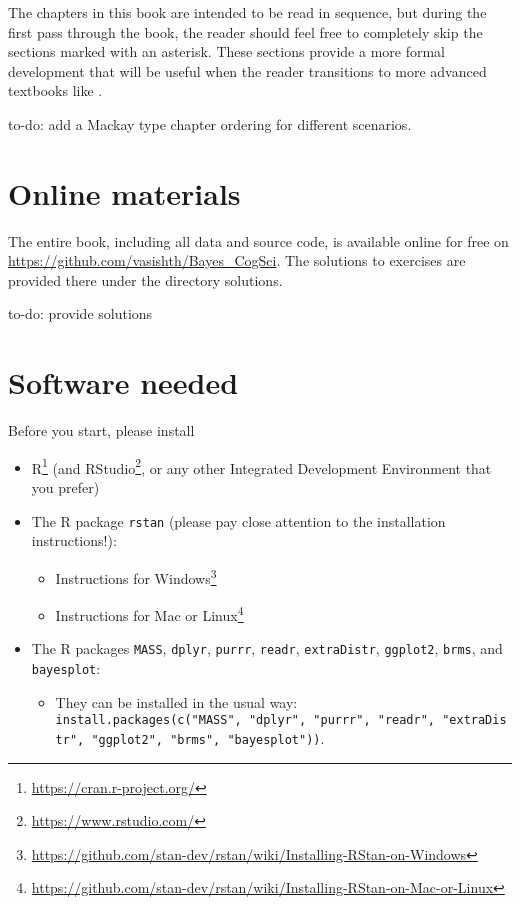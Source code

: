 \documentclass[12pt,]{krantz}
\providecommand{\tightlist}{%
  \setlength{\itemsep}{0pt}\setlength{\parskip}{0pt}}
\renewcommand{\href}[2]{#2\footnote{\url{#1}}}
\let\BeginKnitrBlock\begin \let\EndKnitrBlock\end
\begin{document}
The chapters in this book are intended to be read in sequence, but during the first pass through the book, the reader should feel free to completely skip the sections marked with an asterisk. These sections provide a more formal development that will be useful when the reader transitions to more advanced textbooks like \citet{Gelman14}.

\BeginKnitrBlock{rmdnote}
to-do: add a Mackay type chapter ordering for different scenarios.
\EndKnitrBlock{rmdnote}

\hypertarget{online-materials}{%
\section{Online materials}\label{online-materials}}

The entire book, including all data and source code, is available online for free on \url{https://github.com/vasishth/Bayes_CogSci}. The solutions to exercises are provided there under the directory solutions.

\BeginKnitrBlock{rmdnote}
to-do: provide solutions
\EndKnitrBlock{rmdnote}

\hypertarget{software-needed}{%
\section{Software needed}\label{software-needed}}

Before you start, please install

\begin{itemize}
\tightlist
\item
  \href{https://cran.r-project.org/}{R} (and \href{https://www.rstudio.com/}{RStudio}, or any other Integrated Development Environment that you prefer)
\item
  The R package \texttt{rstan} (please pay close attention to the installation instructions!):

  \begin{itemize}
  \tightlist
  \item
    \href{https://github.com/stan-dev/rstan/wiki/Installing-RStan-on-Windows}{Instructions for Windows}
  \item
    \href{https://github.com/stan-dev/rstan/wiki/Installing-RStan-on-Mac-or-Linux}{Instructions for Mac or Linux}
  \end{itemize}
\item
  The R packages \texttt{MASS}, \texttt{dplyr}, \texttt{purrr}, \texttt{readr}, \texttt{extraDistr}, \texttt{ggplot2}, \texttt{brms}, and \texttt{bayesplot}:

  \begin{itemize}
  \tightlist
  \item
    They can be installed in the usual way: \texttt{install.packages(c("MASS",\ "dplyr",\ "purrr",\ "readr",\ "extraDistr",\ "ggplot2",\ "brms",\ "bayesplot"))}.
  \end{itemize}
\end{itemize}
\end{document}
